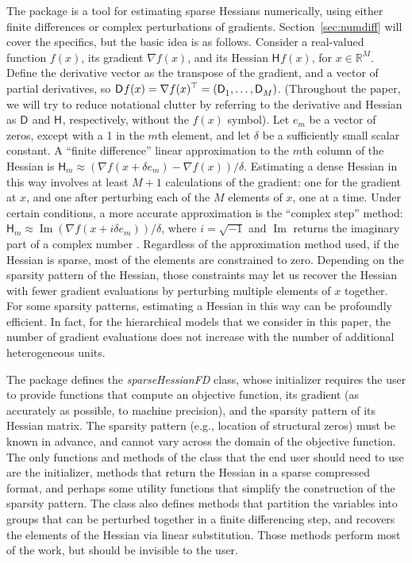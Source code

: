 \documentclass[jss]{jss}\usepackage[]{graphicx}\usepackage[]{color}
\newcommand{\class}[1]{\textsl{#1}}
\newcommand{\parD}[3]{\mathsf{D}^{#1}_{#2}#3}
\newcommand{\hess}[2]{\mathsf{H}_{#1}#2}
\DeclareMathOperator{\Imag}{Im}
\begin{document}
The  package is a tool for estimating
sparse Hessians numerically, using either finite differences or
complex perturbations of
gradients.  Section~\ref{sec:numdiff} will
cover the specifics, but the basic idea is as follows.  Consider a real-valued
function $f(x)$, its gradient $\nabla{f(x)}$, and its Hessian
$\hess{}{f(x)}$, for $x\in\mathbb{R}^M$.  Define the derivative vector
as the transpose of the gradient, and a vector of partial derivatives, so
${\parD{}{}{f(x)}=\nabla f(x)^\top=\left(\parD{}{1}{},\mathellipsis,\parD{}{M}{}\right)}$.   (Throughout the paper, we will try
to reduce notational clutter by referring to the derivative and
Hessian as $\parD{}{}{}$ and $\hess{}{}$, respectively, without the
$f(x)$ symbol).  Let $e_m$ be a vector of zeros, except with a 1 in the $m$th
element, and let $\delta$ be a sufficiently small scalar
constant. A ``finite difference'' linear approximation to the $m$th column of the Hessian is ${\hess{m}{}\approx\left(\nabla f(x+\delta
  e_m)- \nabla f(x)\right)/\delta}$.  Estimating a dense Hessian in this way involves at least $M+1$ calculations of the
gradient: one for the gradient at $x$, and one after perturbing each
of the $M$ elements of $x$, one at a time. Under certain conditions, a
more accurate approximation is the ``complex step'' method:  $\hess{m}{}\approx\Imag\left(\nabla f(x+i\delta
  e_m)\right)/\delta$, where $i=\sqrt{-1}$ and $\Imag$ returns the
imaginary part of a complex
number \citep{SquireTrapp1998}.  Regardless of the approximation method used, if the Hessian is sparse, most of the
elements are constrained to zero.  Depending
on the sparsity pattern of the Hessian, those constraints may let us recover
the Hessian with fewer gradient evaluations by perturbing multiple
elements of $x$ together.  For some sparsity patterns, estimating a Hessian in
this way can be profoundly efficient.  In fact, for the hierarchical models that we consider in
this paper, the number of gradient evaluations does not increase with
the number of additional heterogeneous units.

The package defines the \class{sparseHessianFD} class, whose initializer
requires the user to provide functions that compute an objective
function, its gradient (as accurately as possible, to machine precision), and the sparsity pattern of its Hessian
matrix. The sparsity pattern (e.g., location of structural
zeros) must be known in advance, and cannot vary across the domain of the
objective function. The only functions and methods of the class that
the end user should need to use are the
initializer, methods that return the Hessian
in a sparse compressed format, and perhaps some utility functions that
simplify the construction of the sparsity pattern.  The class also
defines methods that partition the variables into groups that can be perturbed together in a finite
differencing step, and recovers the elements of the Hessian via linear
substitution.  Those methods perform most of the work, but should be
invisible to the user.
\end{document}

